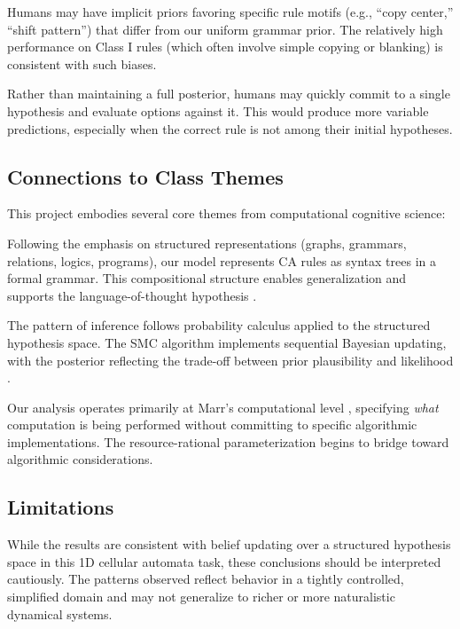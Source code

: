 \documentclass[10pt,letterpaper]{article}
\begin{document}
Humans may have implicit priors favoring specific rule motifs (e.g., ``copy center,'' ``shift pattern'') that differ from our uniform grammar prior. The relatively high performance on Class I rules (which often involve simple copying or blanking) is consistent with such biases.

Rather than maintaining a full posterior, humans may quickly commit to a single hypothesis and evaluate options against it. This would produce more variable predictions, especially when the correct rule is not among their initial hypotheses.

\subsection{Connections to Class Themes}

This project embodies several core themes from computational cognitive science:

Following the emphasis on structured representations (graphs, grammars, relations, logics, programs), our model represents CA rules as syntax trees in a formal grammar. This compositional structure enables generalization and supports the language-of-thought hypothesis \cite{goodman2014concepts}.

The pattern of inference follows probability calculus applied to the structured hypothesis space. The SMC algorithm implements sequential Bayesian updating, with the posterior reflecting the trade-off between prior plausibility and likelihood \cite{saad2019bayesian}.

Our analysis operates primarily at Marr's computational level \cite{marr1982vision}, specifying \textit{what} computation is being performed without committing to specific algorithmic implementations. The resource-rational parameterization begins to bridge toward algorithmic considerations.

\subsection{Limitations}

While the results are consistent with belief updating over a structured hypothesis space in this 1D cellular automata task, these conclusions should be interpreted cautiously. The patterns observed reflect behavior in a tightly controlled, simplified domain and may not generalize to richer or more naturalistic dynamical systems.
\end{document}
